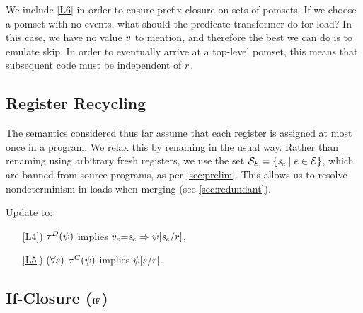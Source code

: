 We include \ref{L6} in order to ensure prefix closure on sets of pomsets.  If
we choose a pomset with no events, what should the predicate transformer do
for load?  In this case, we have no value $v$ to mention, and therefore
the best we can do is to emulate skip.  In order to eventually arrive at a
top-level pomset, this means that subsequent code must be independent of
$r$.

\subsection{Register Recycling}

The semantics considered thus far assume that each register is assigned at
most once in a program.  We relax this by renaming in the usual way.  Rather
than renaming using arbitrary fresh registers, we use the set
$\mathcal{S}_{\mathcal{E}}=\{\mathit{s}_{e}\mid e\in\mathcal{E}\}$, which are banned
from source programs, as per \textsection\ref{sec:prelim}.  This allows us to
resolve nondeterminism in loads when merging (see
\textsection\ref{sec:redundant}).


\begin{definition}[$\xRecycle$]
  \label{def:pomsets-if}
  Update  to:
  \begin{enumerate}
  \item[\ref{L4})] 
    $\aTr{\bEvs}{\bForm}$ implies $v_e{=}\mathit{s}_{e}\Rightarrow\psi[\mathit{s}_{e}/r]$, 
  \item[\ref{L5})] 
    $(\forall s)$ $\aTr{\cEvs}{\bForm}$ implies $\psi[s/r]$. 
  \end{enumerate}
\end{definition}

\subsection{If-Closure (${\textsc{if}}$)}
\label{sec:if}




